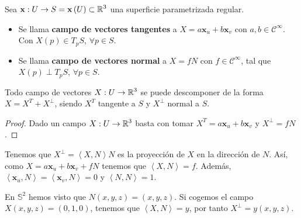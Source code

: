 \begin{definition}
	Sea $\displaystyle \textbf{x} : U \to S = \textbf{x} \left(U\right)\subset \mathbb{R}^{3} $ una superficie parametrizada regular.
	\begin{itemize}
	\item Se llama \textbf{campo de vectores tangentes} a $\displaystyle X = a \textbf{x} _{u} + b \textbf{x} _{v}  $ con $\displaystyle a,b\in \mathcal{C}^{\infty } $. Con $\displaystyle X\left(p\right) \in T_{p}S $, $\displaystyle \forall p \in S $.
	\item Se llama \textbf{campo de vectores normal} a $\displaystyle X = fN $ con $\displaystyle f \in \mathcal{C}^{\infty } $, tal que $\displaystyle X \left(p\right)\perp T_{p}S $, $\displaystyle \forall p \in S $.
	\end{itemize}
\end{definition}
\begin{prop}
Todo campo de vectores $\displaystyle X : U \to \mathbb{R}^{3} $ se puede descomponer de la forma $\displaystyle X = X^{T} + X^{\perp } $, siendo $\displaystyle X^{T} $ tangente a $\displaystyle S $ y $\displaystyle X^{\perp } $ normal a $\displaystyle S $. 
\end{prop}
\begin{proof}
Dado un campo $\displaystyle X : U \to \mathbb{R}^{3} $ basta con tomar $\displaystyle X^{T}= a \textbf{x} _{u} + b \textbf{x} _{v} $ y $\displaystyle X ^{\perp }=f N $. 
\end{proof}
\begin{observation}
Tenemos que $\displaystyle X^{\perp }= \left\langle X,N \right\rangle N $ es la proyección de $\displaystyle X $ en la dirección de $\displaystyle N $. Así, como $\displaystyle X = a \textbf{x} _{u} + b \textbf{x} _{v} + fN $ tenemos que $\displaystyle \left\langle X, N \right\rangle =f $. Además, $\displaystyle \left\langle \textbf{x} _{u}, N \right\rangle = \left\langle \textbf{x} _{v}, N \right\rangle =0 $ y $\displaystyle \left\langle N, N \right\rangle =1 $. 
\end{observation}
\begin{eg}[Esfera]
En $\displaystyle \mathbb{S}^{2} $ hemos visto que $\displaystyle N\left(x,y,z\right)=\left(x,y,z\right) $. Si cogemos el campo $\displaystyle X\left(x,y,z\right)=\left(0,1,0\right) $, tenemos que $\displaystyle \left\langle X, N \right\rangle =y $, por tanto $\displaystyle X^{\perp } = y\left(x,y,z\right) $. 
\end{eg}
